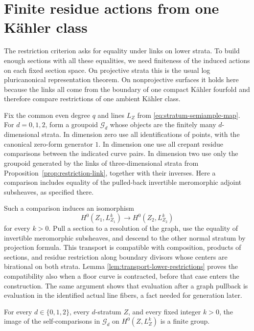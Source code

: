\section{Finite residue actions from one K\"ahler class}\label{sec:scalars}

The restriction criterion asks for equality under links on lower strata.
To build enough sections with all these equalities, we need finiteness of
the induced actions on each fixed section space.  On projective strata this
is the usual log pluricanonical representation theorem.  On nonprojective
surfaces it holds here because the links all come from the boundary of one
compact K\"ahler fourfold and therefore compare restrictions of one
ambient K\"ahler class.

Fix the common even degree \(q\) and lines \(L_Z\) from
\eqref{eq:stratum-semiample-map}.  For \(d=0,1,2\), form a groupoid
\(\mathcal G_d\) whose objects are the finitely many \(d\)-dimensional
strata.  In dimension zero use all identifications of points, with the
canonical zero-form generator \(1\).  In dimension one use all crepant
residue comparisons between the indicated curve pairs.  In dimension two
use only the groupoid generated by the links of three-dimensional strata
from Proposition~\ref{prop:restriction-link}, together with their inverses.
Here a comparison includes equality of the pulled-back invertible
meromorphic adjoint subsheaves, as specified there.

Such a comparison induces an isomorphism
\[
 H^0(Z_1,L_{Z_1}^k)\longrightarrow H^0(Z_2,L_{Z_2}^k)
\]
for every \(k>0\).  Pull a section to a resolution of the graph, use the
equality of invertible meromorphic subsheaves, and descend to the other
normal stratum by projection formula.  This transport is compatible with
composition, products of sections, and residue restriction along boundary
divisors whose centers are birational on both strata.  Lemma
\ref{lem:transport-lower-restrictions} proves the compatibility also when
a floor curve is contracted, before that case enters the construction.
The same
argument shows that evaluation after a graph pullback is evaluation in
the identified actual line fibers, a fact needed for generation later.

\begin{proposition}\label{prop:finite-isotropy}
For every \(d\in\{0,1,2\}\), every \(d\)-stratum \(Z\), and every fixed
integer \(k>0\), the image of the self-comparisons in \(\mathcal G_d\)
on \(H^0(Z,L_Z^k)\) is a finite group.
\end{proposition}

